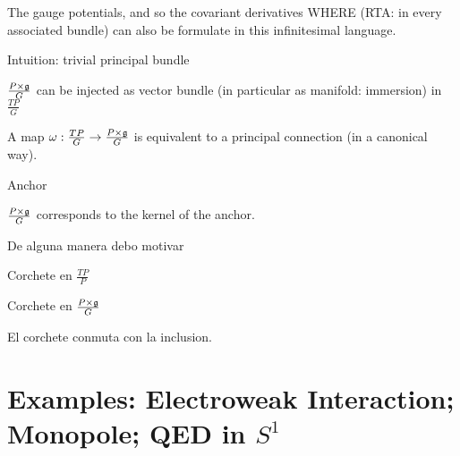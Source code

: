 The gauge potentials, and so the covariant derivatives WHERE (RTA: in every associated bundle) can also be formulate in this infinitesimal language. 

Intuition: trivial principal bundle

\begin{proposition}
$\frac{P \times \mathfrak{g}}{G}$ can be injected as vector bundle (in particular as manifold: immersion) in $\frac{TP}{G}$
\end{proposition}

\begin{theorem}
A map $\omega:\frac{TP}{G} \to \frac{P \times \mathfrak{g}}{G}$ is equivalent to a principal connection (in a canonical way).
\end{theorem}

\begin{definition}
Anchor
\end{definition}

\begin{proposition}
$\frac{P \times \mathfrak{g}}{G}$ corresponds to the kernel of the anchor.
\end{proposition}

De alguna manera debo motivar 

\begin{definition}
Corchete en $\frac{TP}{P}$
\end{definition}

\begin{definition}
Corchete en $\frac{P \times \mathfrak{g}}{G}$
\end{definition}

\begin{proposition}
El corchete conmuta con la inclusion.
\end{proposition}



\section{Examples: Electroweak Interaction; Monopole; QED in $S^1$}


